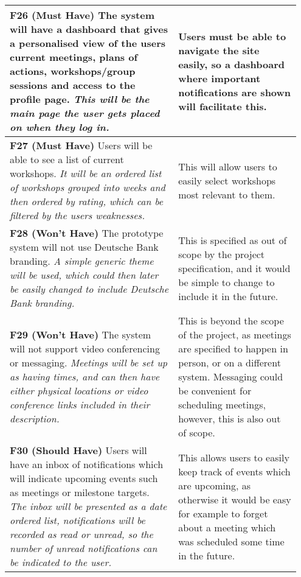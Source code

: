 \documentclass[10pt]{article}
\begin{document}
\begin{longtable}{|p{0.55\linewidth}|p{0.4\linewidth}|}
    \textbf{F26 (Must Have) }
    The system will have a dashboard that gives a personalised view of the users
    current meetings, plans of actions, workshops/group sessions and access to
    the profile page.
    \textit{This will be the main page the user gets placed on when they log in.}
        &
    Users must be able to navigate the site easily, so a dashboard where
    important notifications are shown will facilitate this.
    \\ \hline

    \textbf{F27 (Must Have) }
    Users will be able to see a list of current workshops.
    \textit{It will be an ordered list of workshops grouped into weeks and then
    ordered by rating, which can be filtered by the users weaknesses.}
    &
    This will allow users to easily select workshops most relevant to them.
    \\ \hline

    \textbf{F28 (Won't Have) }
    The prototype system will not use Deutsche Bank branding.
    \textit{A simple generic theme will be used, which could then later be
    easily changed to include Deutsche Bank branding.}
    &
    This is specified as out of scope by the project specification, and it would
    be simple to change to include it in the future.
    \\ \hline

    \textbf{F29 (Won't Have) }
    The system will not support video conferencing or messaging.
    \textit{Meetings will be set up as having times, and can then have either
    physical locations or video conference links included in their description.}
    &
    This is beyond the scope of the project, as meetings are specified to happen
    in person, or on a different system. Messaging could be convenient for
    scheduling meetings, however, this is also out of scope.
    \\ \hline

    \textbf{F30 (Should Have) }
    Users will have an inbox of notifications which will indicate upcoming
    events such as meetings or milestone targets.
    \textit{The inbox will be presented as a date ordered list, notifications
    will be recorded as read or unread, so the number of unread notifications
    can be indicated to the user.}
    &
    This allows users to easily keep track of events which are upcoming, as
    otherwise it would be easy for example to forget about a meeting which
    was scheduled some time in the future.
    \\ \hline

\end{longtable}
\end{document}
